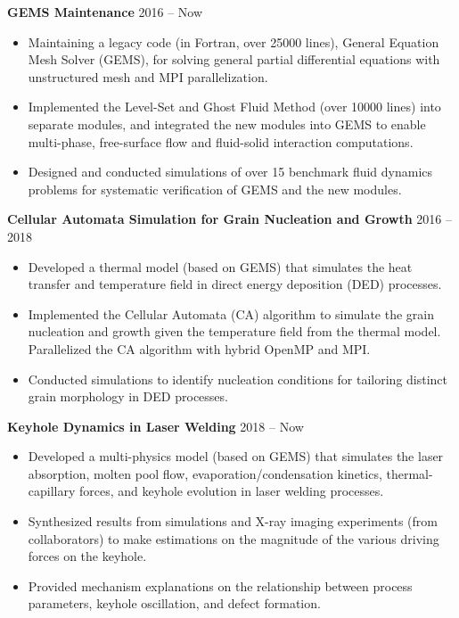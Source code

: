 \documentclass[11pt, letterpaper]{article}
\begin{document}
\vspace{3pt}

\textbf{GEMS Maintenance} \hfill 2016 -- Now
\begin{itemize}[leftmargin=*, labelsep=5mm]
   \item Maintaining a legacy code (in Fortran, over 25000 lines), General Equation Mesh Solver
      (GEMS), for solving general partial differential equations with unstructured mesh and MPI
      parallelization.
   \item Implemented the Level-Set and Ghost Fluid Method (over 10000 lines) into separate modules,
      and integrated the new modules into GEMS to enable multi-phase, free-surface flow and
      fluid-solid interaction computations.
   \item Designed and conducted simulations of over 15 benchmark fluid dynamics
      problems for systematic verification of GEMS and the new modules.
\end{itemize}

\vspace{3pt}

\textbf{Cellular Automata Simulation for Grain Nucleation and Growth} \hfill 2016 -- 2018
\begin{itemize}[leftmargin=*, labelsep=5mm]
   \item Developed a thermal model (based on GEMS) that simulates the heat transfer and
      temperature field in direct energy deposition (DED) processes.
   \item Implemented the Cellular Automata (CA) algorithm to simulate the grain nucleation and
      growth given the temperature field from the thermal model. Parallelized the CA algorithm with
      hybrid OpenMP and MPI.
   \item Conducted simulations to identify nucleation conditions for tailoring distinct
      grain morphology in DED processes.
\end{itemize}

\vspace{3pt}

\textbf{Keyhole Dynamics in Laser Welding} \hfill 2018 -- Now
\begin{itemize}[leftmargin=*, labelsep=5mm]
   \item Developed a multi-physics model (based on GEMS) that simulates the laser absorption, molten
      pool flow, evaporation/condensation kinetics, thermal-capillary forces, and keyhole evolution
      in laser welding processes.
   \item Synthesized results from simulations and X-ray imaging experiments (from collaborators) to
      make estimations on the magnitude of the various driving forces on the keyhole.
   \item Provided mechanism explanations on the relationship between process parameters, keyhole
      oscillation, and defect formation.
\end{itemize}
\end{document}
